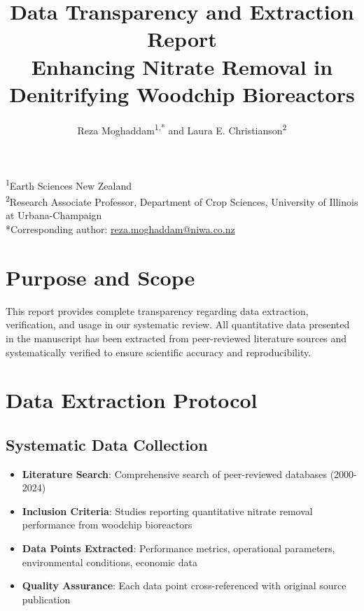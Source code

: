 \documentclass[12pt,a4paper]{article}
\title{\textbf{Data Transparency and Extraction Report}\\
\large Enhancing Nitrate Removal in Denitrifying Woodchip Bioreactors}
\author{Reza Moghaddam\textsuperscript{1,*} and Laura E. Christianson\textsuperscript{2}}
\date{}
\begin{document}
\maketitle

\begin{center}
\footnotesize
\textsuperscript{1}Earth Sciences New Zealand\\
\textsuperscript{2}Research Associate Professor, Department of Crop Sciences, University of Illinois at Urbana-Champaign\\
*Corresponding author: \href{mailto:reza.moghaddam@niwa.co.nz}{reza.moghaddam@niwa.co.nz}
\end{center}

\section{Purpose and Scope}

This report provides complete transparency regarding data extraction, verification, and usage in our systematic review. All quantitative data presented in the manuscript has been extracted from peer-reviewed literature sources and systematically verified to ensure scientific accuracy and reproducibility.

\section{Data Extraction Protocol}

\subsection{Systematic Data Collection}
\begin{itemize}[leftmargin=*]
\item \textbf{Literature Search}: Comprehensive search of peer-reviewed databases (2000-2024)
\item \textbf{Inclusion Criteria}: Studies reporting quantitative nitrate removal performance from woodchip bioreactors
\item \textbf{Data Points Extracted}: Performance metrics, operational parameters, environmental conditions, economic data
\item \textbf{Quality Assurance}: Each data point cross-referenced with original source publication
\end{itemize}
\end{document}
